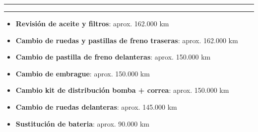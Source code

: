 \documentclass[11pt,a4paper]{article}
\date{21.03.2023}
\begin{document}
\vskip 10mm
\hrule \vskip 5mm
\vskip 5mm \hrule
\vskip 10mm

\begin{itemize}
\item \textbf{Revisión de aceite y filtros}: aprox. 162.000 km
\item \textbf{Cambio de ruedas y pastillas de freno traseras}: aprox. 162.000 km
\item \textbf{Cambio de pastilla de freno delanteras}: aprox. 150.000 km
\item \textbf{Cambio de embrague}: aprox. 150.000 km
\item \textbf{Cambio kit de distribución bomba + correa}: aprox. 150.000 km
\item \textbf{Cambio de ruedas delanteras}: aprox. 145.000 km
\item \textbf{Sustitución de bateria}: aprox. 90.000 km
\end{itemize}
\end{document}
